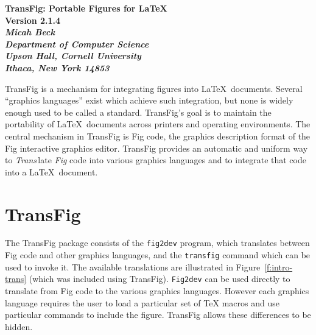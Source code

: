 %


%
\newcommand{\version}{2.1.4}
%
\cfoot{\small Version \version}
%
\newcommand{\DVI}{{\sc dvi}}
\newcommand{\EPIC}{{\sc epic}}
\newcommand{\EEPIC}{{\sc eepic}}
\newcommand{\FTP}{{\tt FTP}}
\newcommand{\PIC}{{\sc pic}}
\newcommand{\PS}{{\sc ps}}
\newcommand{\psfig}{{\bf psfig}}
\newcommand{\PicTeX}{{PiC\TeX}}
\newcommand{\TFX}{{\sc tfx}}
\newcommand{\tpic}{{\tt tpic}}
\newcommand{\textyl}{{\TeX{tyl}}}
%


\begin{center}

\Large	\bf	TransFig: Portable Figures for \LaTeX\ \\
	\rm	Version \version \\[0.15in]

\large	\it	Micah Beck
			 \\

\rm		Department of Computer Science \\
		Upson Hall, Cornell University \\
		Ithaca, New York  14853 \\[0.15in]
\end{center}

TransFig is a mechanism for integrating figures into \LaTeX\ documents.
Several ``graphics languages'' exist which achieve such integration,
	but none is widely enough used to be called a standard.
TransFig's goal is to maintain the portability of \LaTeX\ documents across
	printers and operating environments.
The central mechanism in TransFig is Fig code,
	the graphics description format of the Fig interactive graphics editor.
TransFig provides an automatic and uniform way to
	{\it Trans}\,late {\it Fig} code into various graphics languages and
	to integrate that code into a \LaTeX\ document.

\section{TransFig}
The TransFig package consists of the {\tt fig2dev} program,
	which translates between Fig code and other graphics languages,
	and the {\tt transfig} command which can be used to invoke it.
The available translations are illustrated in Figure~\ref{f:intro-trans}
	(which was included using TransFig).
{\tt Fig2dev} can be used directly to translate from Fig code to
	the various graphics languages.
However each graphics language requires the user to load a particular set of
	TeX macros and use particular commands to include the figure.
TransFig allows these differences to be hidden.

